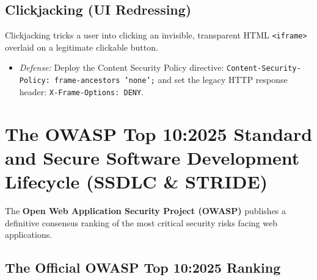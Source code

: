 \subsection{Clickjacking (UI Redressing)}

Clickjacking tricks a user into clicking an invisible, transparent HTML \texttt{<iframe>} overlaid on a legitimate clickable button.
\begin{itemize}
\item \textit{Defense:} Deploy the Content Security Policy directive: \texttt{Content-Security-Policy: frame-ancestors 'none';} and set the legacy HTTP response header: \texttt{X-Frame-Options: DENY}.
\end{itemize}

\newpage
\section{The OWASP Top 10:2025 Standard and Secure Software Development Lifecycle (SSDLC \& STRIDE)}

The \textbf{Open Web Application Security Project (OWASP)} publishes a definitive consensus ranking of the most critical security risks facing web applications.

\subsection{The Official OWASP Top 10:2025 Ranking}

